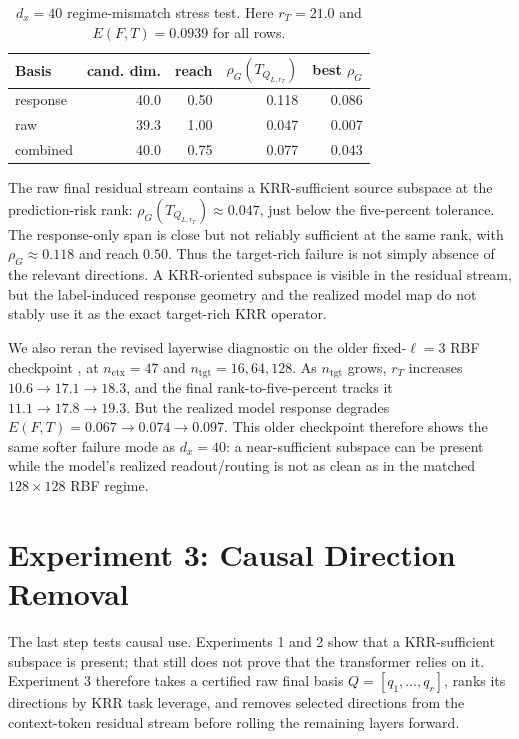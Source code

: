 \documentclass[11pt]{article}
\begin{document}
\begin{table}[htbp]
\centering
\caption{\(d_x=40\) regime-mismatch stress test. Here \(r_T=21.0\) and
\(E(F,T)=0.0939\) for all rows.}
\scriptsize
\setlength{\tabcolsep}{4pt}
\renewcommand{\arraystretch}{0.9}
\begin{tabular}{lrrrr}
\toprule
Basis & cand. dim. & reach & \(\rho_G(T_{Q_{L,r_T}})\) & best \(\rho_G\)\\
\midrule
response & 40.0 & 0.50 & 0.118 & 0.086\\
raw      & 39.3 & 1.00 & 0.047 & 0.007\\
combined & 40.0 & 0.75 & 0.077 & 0.043\\
\bottomrule
\end{tabular}
\renewcommand{\arraystretch}{1}
\end{table}

The raw final residual stream contains a KRR-sufficient source subspace at the prediction-risk rank:
\(\rho_G(T_{Q_{L,r_T}})\approx0.047\), just below the five-percent tolerance. The response-only
span is close but not reliably sufficient at the same rank, with \(\rho_G\approx0.118\) and
reach \(0.50\). Thus the target-rich failure is not simply absence of the relevant directions. A
KRR-oriented subspace is visible in the residual stream, but the label-induced response geometry
and the realized model map do not stably use it as the exact target-rich KRR operator.

We also reran the revised layerwise diagnostic on the older fixed-\(\ell=3\) RBF checkpoint
, at \(n_{\mathrm{ctx}}=47\) and
\(n_{\mathrm{tgt}}=16,64,128\). As \(n_{\mathrm{tgt}}\) grows, \(r_T\) increases
\(10.6\to17.1\to18.3\), and the final rank-to-five-percent tracks it
\(11.1\to17.8\to19.3\). But the realized model response degrades
\(E(F,T)=0.067\to0.074\to0.097\). This older checkpoint therefore shows the same softer failure
mode as \(d_x=40\): a near-sufficient subspace can be present while the model's realized
readout/routing is not as clean as in the matched \(128\times128\) RBF regime.

\section{Experiment 3: Causal Direction Removal}

The last step tests causal use. Experiments 1 and 2 show that a KRR-sufficient subspace is present;
that still does not prove that the transformer relies on it. Experiment 3 therefore takes a
certified raw final basis \(Q=[q_1,\ldots,q_r]\), ranks its directions by KRR task leverage, and
removes selected directions from the context-token residual stream before rolling the remaining
layers forward.
\end{document}
